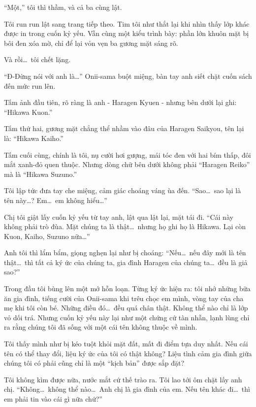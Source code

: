 \documentclass[../main.tex]{subfiles}
\begin{document}
``Một,'' tôi thì thầm, và cả ba cùng lật.

Tôi run run lật sang trang tiếp theo. Tim tôi như thắt lại khi nhìn thấy lớp khác được in trong cuốn kỷ yếu. Vẫn cùng một kiểu trình bày: phần lớn khuôn mặt bị bôi đen xóa mờ, chỉ để lại vỏn vẹn ba gương mặt sáng rõ.

Và rồi\dots\ tôi chết lặng.

``Đ-Đừng nói với anh là\dots'' Onii-sama buột miệng, bàn tay anh siết chặt cuốn sách đến mức run lên.

Tấm ảnh đầu tiên, rõ ràng là anh - Haragen Kyuen - nhưng bên dưới lại ghi: ``Hikawa Kuon.''

Tấm thứ hai, gương mặt chẳng thể nhầm vào đâu của Haragen Saikyou, tên lại là: ``Hikawa Kaiho.''

Tấm cuối cùng, chính là tôi, nụ cười hơi gượng, mái tóc đen với hai bím thấp, đôi mắt xanh-đỏ quen thuộc. Nhưng dòng chữ bên dưới không phải ``Haragen Reiko'' mà là ``Hikawa Suzuno.''

Tôi lập tức đưa tay che miệng, cảm giác choáng váng ùa đến. ``Sao\dots\ sao lại là tên này\dots? Em\dots\ em không hiểu\dots''

Chị tôi giật lấy cuốn kỷ yếu từ tay anh, lật qua lật lại, mặt tái đi. ``Cái này không phải trò đùa. Mặt chúng ta là thật\dots\ nhưng họ ghi họ là Hikawa. Lại còn Kuon, Kaiho, Suzuno nữa\dots''

Anh tôi thì lẩm bẩm, giọng nghẹn lại như bị choáng: ``Nếu\dots\ nếu đây mới là tên thật\dots\ thì tất cả ký ức của chúng ta, gia đình Haragen của chúng ta\dots\ đều là giả sao?''

Trong đầu tôi bùng lên một mớ hỗn loạn. Từng ký ức hiện ra: tôi nhớ những bữa ăn gia đình, tiếng cười của Onii-sama khi trêu chọc em mình, vòng tay của cha mẹ khi tôi còn bé. Những điều đó\dots\ đều quá chân thật. Không thể nào chỉ là lớp vỏ dối trá. Nhưng cuốn kỷ yếu này lại như một chứng cứ tàn nhẫn, lạnh lùng chỉ ra rằng chúng tôi đã sống với một cái tên không thuộc về mình.

Tôi thấy mình như bị kéo tuột khỏi mặt đất, mất đi điểm tựa duy nhất. Nếu cái tên có thể thay đổi, liệu ký ức của tôi có thật không? Liệu tình cảm gia đình giữa chúng tôi có phải cũng chỉ là một ``kịch bản'' được sắp đặt?

Tôi không kìm được nữa, nước mắt cứ thế trào ra. Tôi lao tới ôm chặt lấy anh chị. ``Không\dots\ không thể nào\dots\ Anh chị là gia đình của em. Nếu tên khác đi\dots\ thì em phải tin vào cái gì nữa chứ?''
\end{document}

